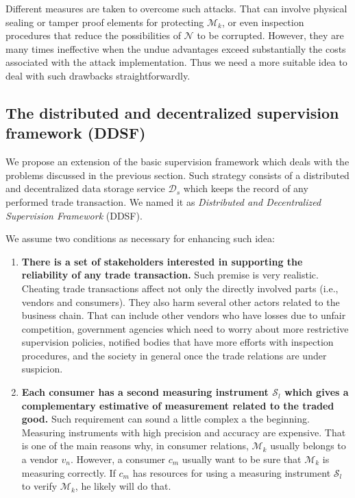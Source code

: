 \documentclass[sigplan]{acmart}
\begin{document}
Different measures are taken to overcome such attacks.
That can involve physical sealing or tamper proof elements for protecting $\mathcal{M}_k$, or even inspection procedures that reduce the possibilities of $\mathcal{N}$ to be corrupted.
However, they are many times ineffective when the undue advantages exceed substantially the costs associated with the attack implementation.
Thus we need a more suitable idea to deal with such drawbacks straightforwardly.

\subsection{The distributed and decentralized supervision framework (DDSF)}
We propose an extension of the basic supervision framework which deals with the problems discussed in the previous section.
Such strategy consists of a distributed and decentralized data storage service $\mathcal{D}_s$ which keeps the record of any performed trade transaction.
We named it as \emph{Distributed and Decentralized Supervision Framework} (DDSF).

We assume two conditions as necessary for enhancing such idea:
\begin{enumerate}
 \item \textbf{There is a set of stakeholders interested in supporting the reliability of any trade transaction.} 
  Such premise is very realistic. 
  Cheating trade transactions affect not only the directly involved parts (i.e., vendors and consumers).
  They also harm several other actors related to the business chain.
  That can include other vendors who have losses due to unfair competition, government agencies which need to worry about more restrictive supervision policies, notified bodies that have more efforts with inspection procedures, and the society in general once the trade relations are under suspicion.
 \item \textbf{Each consumer has a second measuring instrument $\mathcal{S}_l$ which gives a complementary estimative of measurement   	related to the traded good.}
  Such requirement can sound a little complex a the beginning.
  Measuring instruments with high precision and accuracy are expensive.
  That is one of the main reasons why, in consumer relations, $\mathcal{M}_k$ usually belongs to a vendor $v_n$.
  However, a consumer $c_m$ usually want to be sure that $\mathcal{M}_k$ is measuring correctly.
  If $c_m$ has resources for using a measuring instrument $\mathcal{S}_l$ to verify $\mathcal{M}_k$, he likely will do that.
\end{enumerate}
\end{document}
